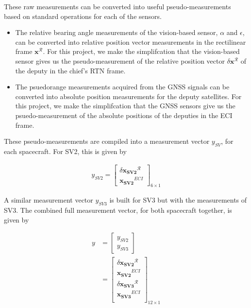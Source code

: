 These raw measurements can be converted into useful pseudo-measurements based on standard operations for each of the sensors. 
\begin{itemize}
    \item The relative bearing angle measurements of the vision-based sensor, $\alpha$ and $\epsilon$, can be converted into relative position vector measurements in the rectilinear frame $\boldsymbol{x}^\mathcal{R}$. For this project, we make the simplifcation that the vision-based sensor gives us the pseudo-measurement of the relative position vector $\delta \boldsymbol{x}^\mathcal{R}$ of the deputy in the chief's RTN frame.
    \item The psuedorange measurements acquired from the GNSS signals can be converted into absolute position measurements for the deputy satellites. For this project, we make the simplifcation that the GNSS sensors give us the psuedo-measurement of the absolute positions of the deputies in the ECI frame.
\end{itemize}
These pseudo-measurements are compiled into a measurement vector $y_{SV}$, for each spacecraft. For SV2, this is given by

\begin{align}
    y_{SV2} = \begin{bmatrix}
        \delta \boldsymbol{x_{SV2}}^\mathcal{R} \\
        \boldsymbol{x_{SV2}}^{ECI}
    \end{bmatrix}_{6\times 1}
\end{align}

A similar measurement vector $y_{SV3}$ is built for SV3 but with the measurements of SV3. The combined full measurement vector, for both spacecraft together, is given by

\begin{align}
    y &= \begin{bmatrix}
        y_{SV2} \\
        y_{SV3}
    \end{bmatrix} \\
    &= \begin{bmatrix}
        \delta \boldsymbol{x_{SV2}}^\mathcal{R} \\
        \boldsymbol{x_{SV2}}^{ECI} \\
        \delta \boldsymbol{x_{SV3}}^\mathcal{R} \\
        \boldsymbol{x_{SV3}}^{ECI} \\
    \end{bmatrix}_{12\times 1}
\end{align}

